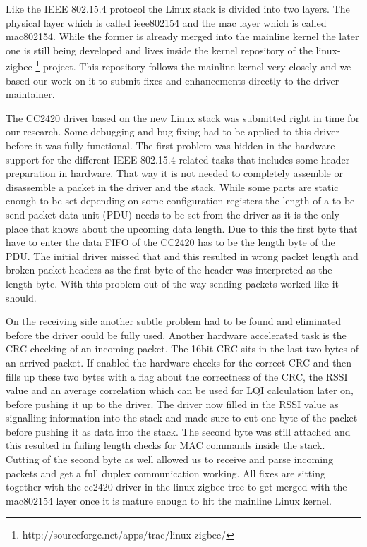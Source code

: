 Like the IEEE 802.15.4 protocol the Linux stack is divided into two layers. The
physical layer which is called ieee802154 and the mac layer which is called
mac802154. While the former is already merged into the mainline kernel the later
one is still being developed and lives inside the kernel repository of the
linux-zigbee \footnote{http://sourceforge.net/apps/trac/linux-zigbee/} project.
This repository follows the mainline kernel very closely
and we based our work on it to submit fixes and enhancements directly to the
driver maintainer.

The CC2420 driver based on the new Linux stack was submitted right in time for
our research. Some debugging and bug fixing had to be applied to this driver
before it was fully functional. The first problem was hidden in the hardware
support for the different IEEE 802.15.4 related tasks that includes
some header preparation in hardware. That way it is not needed to
completely assemble or disassemble a packet in the driver and the stack. While
some parts are static enough to be set depending on some configuration registers
the length of a to be send packet data unit (PDU) needs to be set from the driver
as it is the only place that knows about the upcoming data length. Due to this
the first byte that have to enter the data FIFO of the CC2420 has to be the
length byte of the PDU. The initial driver missed that and this resulted in
wrong packet length and broken packet headers as the first byte of the header
was interpreted as the length byte. With this problem out of the way sending
packets worked like it should.

On the receiving side another subtle problem had to be found and eliminated
before the driver could be fully used. Another hardware accelerated task is the
CRC checking of an incoming packet. The 16bit CRC sits in the last two bytes of
an arrived packet. If enabled the hardware checks for the correct CRC and
then fills up these two bytes with a flag about the correctness of the CRC, the
RSSI value and an average correlation which can be used for LQI calculation
later on, before pushing it up to the driver. The driver now filled in the RSSI
value as signalling information into the stack and made sure to cut one byte
of the packet before pushing it as data into the stack. The second byte was
still attached and this resulted in failing length checks for MAC commands
inside the stack. Cutting of the second byte as well allowed us to receive
and parse incoming packets and get a full duplex communication working. All
fixes are sitting together with the cc2420 driver in the linux-zigbee tree to
get merged with the mac802154 layer once it is mature enough to hit the
mainline Linux kernel.

